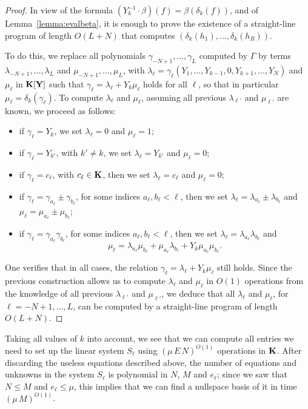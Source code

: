 \documentclass[12pt]{article}
\begin{document}
\begin{proof}
  In view of the formula $(Y_k^{-1} \cdot
  \beta)(f)=\beta(\delta_k(f))$, and of Lemma~\ref{lemma:evalbeta}, it is
  enough to prove the existence of a straight-line program of length
  $O(L+N)$ that computes $(\delta_k(h_1),\dots,\delta_k(h_R))$.

  To do this, we replace all polynomials
  $\gamma_{-N+1},\dots,\gamma_L$ computed by $\Gamma$ by terms
  $\lambda_{-N+1},\dots,\lambda_L$ and $\mu_{-N+1},\dots,\mu_L$, with
  $\lambda_\ell=\gamma_\ell(Y_1,\dots,Y_{k-1},0,Y_{k+1},\dots,Y_N)$
  and $\mu_\ell$ in $\mathbf{K}[\mathbf{Y}]$ such that $\gamma_\ell= \lambda_\ell+Y_k
  \mu_\ell$ holds for all $\ell$, so that in particular
  $\mu_\ell=\delta_k(\gamma_\ell)$.  To compute $\lambda_\ell$ and
  $\mu_\ell$, assuming all previous $\lambda_{\ell'}$ and
  $\mu_{\ell'}$ are known, we proceed as follows:
  \begin{itemize}
  \item if $\gamma_\ell=Y_k$, we set $\lambda_\ell=0$ and $\mu_\ell=1$;
  \item if $\gamma_\ell=Y_{k'}$, with $k' \ne k$, we set $\lambda_\ell=Y_{k'}$ and $\mu_\ell=0$;
  \item if $\gamma_\ell =c_\ell$, with $c_\ell \in \mathbf{K}$,
    then we set $\lambda_\ell=c_\ell$ and  $\mu_\ell=0$;
  \item if $\gamma_\ell = \gamma_{a_\ell} \pm \gamma_{b_\ell}$,
    for some indices $a_\ell,b_\ell < \ell$, 
    then we set $\lambda_\ell=\lambda_{a_\ell}\pm\lambda_{b_\ell}$
    and $\mu_\ell=\mu_{a_\ell}\pm\mu_{b_\ell}$;
\item if $\gamma_\ell = \gamma_{a_\ell} \gamma_{b_\ell}$,
      for some indices $a_\ell,b_\ell < \ell$,
    then we set $\lambda_\ell=\lambda_{a_\ell} \lambda_{b_\ell}$
    and $$\mu_\ell=
\lambda_{a_\ell} \mu_{b_\ell}
+
\mu_{a_\ell} \lambda_{b_\ell}
+
Y_k\mu_{a_\ell} \mu_{b_\ell}.$$
\end{itemize}
One verifies that in all cases, the relation $\gamma_\ell=
\lambda_\ell+Y_k \mu_\ell$ still holds. Since the previous
construction allows us to compute $\lambda_\ell$ and $\mu_\ell$ in
$O(1)$ operations from the knowledge of all previous $\lambda_{\ell'}$
and $\mu_{\ell'}$, we deduce that all $\lambda_\ell$ and $\mu_\ell$,
for $\ell=-N+1,\dots,L$, can be computed by a straight-line program of
length $O(L+N)$.
\end{proof}

Taking all values of $k$ into account, we see that we can compute all
entries we need to set up the linear system $S_\ell$ using
$(\mu\,E\,N)^{O(1)}$ operations in $\mathbf{K}$. After discarding the useless
equations described above, the number of equations and unknowns in the
system $S_\ell$ is polynomial in $N$, $M$ and $e_\ell$; since we saw
that $N \le M$ and $e_\ell \le \mu$, this implies that we can find a
nullspace basis of it in time $(\mu\,M)^{O(1)}$. 
\end{document}
